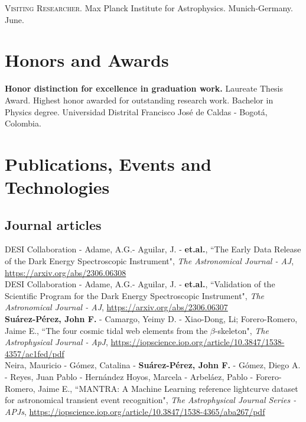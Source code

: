 \documentclass[10pt, a4paper]{article}
\newcommand{\years}[1]{\marginnote{\scriptsize #1}}
\begin{document}
\years{2019}\textsc{Visiting Researcher}. Max Planck Institute for Astrophysics. Munich-Germany. 
{June}.\\

\section*{Honors and Awards}
\noindent
\years{2014}\textbf{Honor distinction for excellence in graduation work.} Laureate Thesis Award. 
Highest honor awarded for outstanding research work. Bachelor in Physics degree. Universidad 
Distrital Francisco José de Caldas - Bogotá, Colombia.




\section*{Publications, Events and Technologies}

\subsection*{Journal articles}
\noindent
\years{2023}DESI Collaboration - Adame, A.G.- Aguilar, J. - \textbf{et.al.}, “The Early Data 
Release 
of the Dark Energy Spectroscopic Instrument", \emph{The Astronomical Journal - AJ}, 
\url{https://arxiv.org/abs/2306.06308} 
\\

\years{2023}DESI Collaboration - Adame, A.G.- Aguilar, J. - \textbf{et.al.}, “Validation of the 
Scientific Program for the Dark Energy Spectroscopic Instrument", \emph{The Astronomical Journal - AJ}, 
\url{https://arxiv.org/abs/2306.06307} 
\\

\years{2021}\textbf{Suárez-Pérez, John F.} - Camargo, Yeimy D. - Xiao-Dong, Li; Forero-Romero, Jaime E., “The four cosmic tidal web elements from the $\beta$-skeleton", \emph{The Astrophysical Journal - ApJ}, \url{https://iopscience.iop.org/article/10.3847/1538-4357/ac1fed/pdf}
\\

\years{2020}Neira, Mauricio - Gómez, Catalina - \textbf{Suárez-Pérez, John F.} - Gómez, Diego A. - Reyes, Juan Pablo - Hernández Hoyos, Marcela - Arbeláez, Pablo - Forero-Romero, Jaime E., “MANTRA: A Machine Learning reference lightcurve dataset for astronomical transient event recognition", \emph{The Astrophysical Journal Series - APJs}, \url{https://iopscience.iop.org/article/10.3847/1538-4365/aba267/pdf} 
\\
\end{document}
